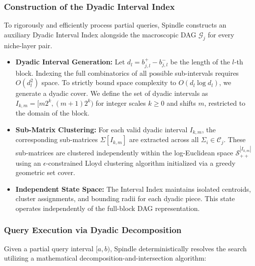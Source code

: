 \documentclass[pdflatex,sn-mathphys-num]{sn-jnl}%
\theoremstyle{thmstyleone}%
\theoremstyle{thmstyletwo}%
\theoremstyle{thmstylethree}%
\begin{document}
\subsubsection{Construction of the Dyadic Interval Index}
To rigorously and efficiently process partial queries, Spindle constructs an auxiliary Dyadic Interval Index alongside the macroscopic DAG $\mathcal{G}_j$ for every niche-layer pair.

\begin{itemize}
    \item \textbf{Dyadic Interval Generation:} Let $d_l = b_{j,l}^+ - b_{j,l}^-$ be the length of the $l$-th block. Indexing the full combinatorics of all possible sub-intervals requires $O(d_l^2)$ space. To strictly bound space complexity to $O(d_l \log d_l)$, we generate a dyadic cover. We define the set of dyadic intervals as $I_{k, m} = [m 2^k, (m+1) 2^k)$ for integer scales $k \ge 0$ and shifts $m$, restricted to the domain of the block.
    \item \textbf{Sub-Matrix Clustering:} For each valid dyadic interval $I_{k,m}$, the corresponding sub-matrices $\Sigma[I_{k,m}]$ are extracted across all $\Sigma_i \in \mathcal{C}_j$. These sub-matrices are clustered independently within the log-Euclidean space $\mathcal{S}_{++}^{|I_{k,m}|}$ using an $\epsilon$-constrained Lloyd clustering algorithm initialized via a greedy geometric set cover.
    \item \textbf{Independent State Space:} The Interval Index maintains isolated centroids, cluster assignments, and bounding radii for each dyadic piece. This state operates independently of the full-block DAG representation.
\end{itemize}

\subsubsection{Query Execution via Dyadic Decomposition}
Given a partial query interval $[a, b)$, Spindle deterministically resolves the search utilizing a mathematical decomposition-and-intersection algorithm:
\end{document}
